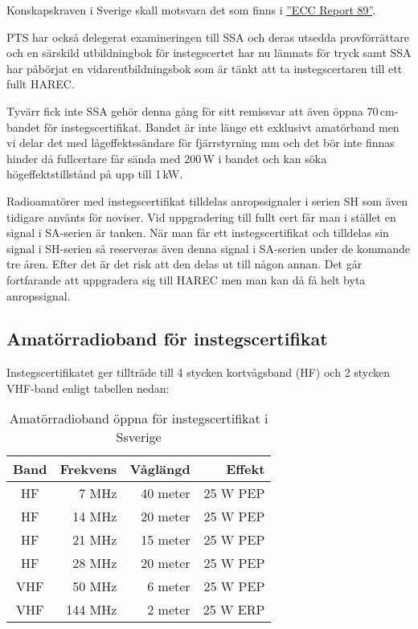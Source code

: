 Konskapskraven i Sverige skall motsvara det som finns i
\href{https://docdb.cept.org/download/409}{''ECC Report 89''}.

PTS har också delegerat examineringen till SSA och deras utsedda
provförrättare och en särskild utbildningbok för instegscertet har nu lämnats
för tryck samt SSA har påbörjat en vidareutbildningsbok som är tänkt att ta
instegscertaren till ett fullt HAREC.

Tyvärr fick inte SSA gehör denna gång för sitt remissvar att även öppna
70\,cm-bandet för instegscertifikat. Bandet är inte länge ett exklusivt
amatörband men vi delar det med lågeffektssändare för fjärrstyrning mm och det
bör inte finnas hinder då fullcertare får sända med 200\,W i bandet och kan
söka högeffektstillstånd på upp till 1\,kW.

Radioamatörer med instegscertifikat tilldelas anropssignaler i serien SH som
även tidigare använts för noviser. Vid uppgradering till fullt cert får man i
stället en signal i SA-serien är tanken. När man får ett instegscertifikat och
tilldelas sin signal i SH-serien så reserveras även denna signal i SA-serien
under de kommande tre åren. Efter det är det risk att den delas ut till någon
annan. Det går fortfarande att uppgradera sig till HAREC men man kan då få
helt byta anropssignal.

\subsection{Amatörradioband för instegscertifikat}

Instegscertifikatet ger tillträde till 4 stycken kortvågsband (HF) och 2
stycken VHF-band enligt tabellen nedan:

\begin{table}[H]
\centering
\begin{tabular}{crrr}
  \textbf{Band} & \textbf{Frekvens} & \textbf{Våglängd} & \textbf{Effekt} \\ \hline
   HF           & 7 MHz             & 40 meter          & 25 W PEP        \\
   HF           & 14 MHz            & 20 meter          & 25 W PEP        \\
   HF           & 21 MHz            & 15 meter          & 25 W PEP        \\
   HF           & 28 MHz            & 20 meter          & 25 W PEP        \\ \hline
   VHF          & 50 MHz            & 6 meter           & 25 W PEP        \\ 
   VHF          & 144 MHz           & 2 meter           & 25 W ERP
\end{tabular}
\caption{Amatörradioband öppna för instegscertifikat i Ssverige}
\end{table}


